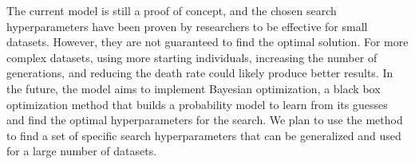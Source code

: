 The current model is still a proof of concept, and the chosen search hyperparameters have been proven by researchers to be effective for small datasets. However, they are not guaranteed to find the optimal solution. For more complex datasets, using more starting individuals, increasing the number of generations, and reducing the death rate could likely produce better results. In the future, the model aims to implement Bayesian optimization, a black box optimization method that builds a probability model to learn from its guesses and find the optimal hyperparameters for the search. We plan to use the method to find a set of specific search hyperparameters that can be generalized and used for a large number of datasets.





\nocite{*}










